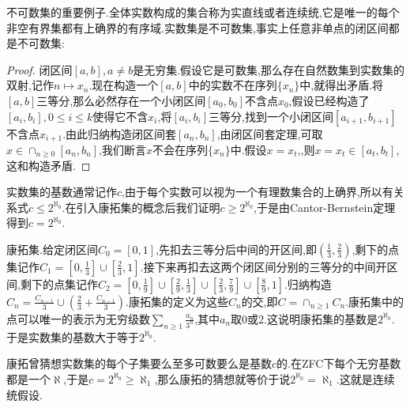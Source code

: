 不可数集的重要例子.全体实数构成的集合称为实直线或者连续统,它是唯一的每个非空有界集都有上确界的有序域.实数集是不可数集,事实上任意非单点的闭区间都是不可数集:
\begin{proof}
	
	闭区间$[a,b],a\not=b$是无穷集.假设它是可数集,那么存在自然数集到实数集的双射,记作$n\mapsto x_n$.现在构造一个$[a,b]$中的实数不在序列$\{x_n\}$中,就得出矛盾.将$[a,b]$三等分,那么必然存在一个小闭区间$[a_0,b_0]$不含点$x_0$,假设已经构造了$[a_i,b_i],0\le i\le k$使得它不含$x_i$,将$[a_i,b_i]$三等分,找到一个小闭区间$[a_{i+1},b_{i+1}]$不含点$x_{i+1}$.由此归纳构造闭区间套$[a_n,b_n]$,由闭区间套定理,可取$x\in\cap_{n\ge0}[a_n,b_n]$,我们断言$x$不会在序列$\{x_n\}$中.假设$x=x_t$,,则$x=x_t\in[a_t,b_t]$,这和构造矛盾.
\end{proof}

实数集的基数通常记作$c$,由于每个实数可以视为一个有理数集合的上确界,所以有关系式$c\le 2^{\aleph_0}$.在引入康拓集的概念后我们证明$c\ge 2^{\aleph_0}$,于是由Cantor-Bernstein定理得到$c=2^{\aleph_0}$.

康拓集.给定闭区间$C_0=[0,1]$,先扣去三等分后中间的开区间,即$(\frac{1}{3},\frac{2}{3})$,剩下的点集记作$C_1=[0,\frac{1}{3}]\cup[\frac{2}{3},1]$.接下来再扣去这两个闭区间分别的三等分的中间开区间,剩下的点集记作$C_2=[0,\frac{1}{9}]\cup[\frac{2}{9},\frac{1}{3}]\cup[\frac{2}{3},\frac{7}{9}]\cup[\frac{8}{9},1]$.归纳构造$C_n=\frac{C_{n-1}}{3}\cup\left(\frac{2}{3}+\frac{C_{n-1}}{3}\right)$.康拓集的定义为这些$C_n$的交,即$C=\cap_{n\ge1}C_n$.康拓集中的点可以唯一的表示为无穷级数$\sum_{n\ge1}\frac{a_n}{3^n}$,其中$a_n$取0或2.这说明康拓集的基数是$2^{\aleph_0}$.于是实数集的基数大于等于$2^{\aleph_0}$.

康拓曾猜想实数集的每个子集要么至多可数要么是基数$c$的.在ZFC下每个无穷基数都是一个$\aleph$,于是$c=2^{\aleph_0}\ge\aleph_1$,那么康拓的猜想就等价于说$2^{\aleph_0}=\aleph_1$.这就是连续统假设.
